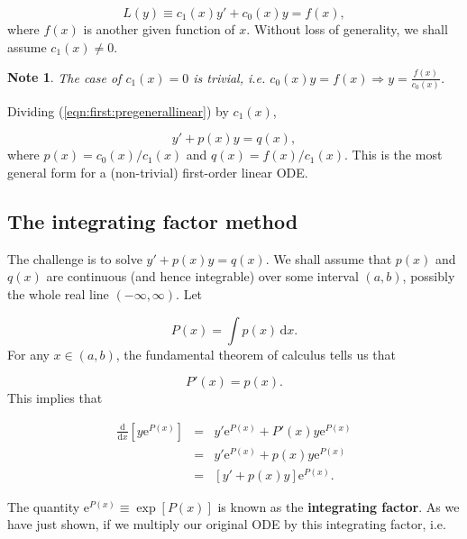 \documentclass[a4paper]{report}
\newtheorem*{note}{Note}
\begin{document}
\begin{equation}
\label{eqn:first:pregenerallinear}
L(y)\equiv c_1(x)y'+c_0(x)y = f(x),
\end{equation}
\noindent where $f(x)$ is another given function of $x$. Without loss of generality, we shall assume $c_1(x)\neq0$. 

\begin{note}
The case of $c_1(x)=0$ is trivial, i.e. $\displaystyle{c_0(x)y = f(x) \Longrightarrow y = \frac{f(x)}{c_0(x)}}$.
\end{note}

\noindent Dividing (\ref{eqn:first:pregenerallinear}) by $c_1(x)$, 

\begin{equation}
\label{eqn:first:generallinear}
y'+p(x)y = q(x),
\end{equation}
\noindent where $p(x)=c_0(x)/c_1(x)$ and $q(x)=f(x)/c_1(x)$. This is the most general form for a (non-trivial) first-order linear ODE.

\subsection{The integrating factor method}
\label{subsec:first:linearint} 
The challenge is to solve $y'+p(x)y = q(x)$. We shall assume that $p(x)$ and $q(x)$ are continuous (and hence integrable) over some interval $(a,b)$, possibly the whole real line $(-\infty,\infty)$. Let 

\begin{displaymath}
P(x) = \int p(x)\,\mathrm{d}x.
\end{displaymath}
\noindent For any $x\in(a,b)$, the fundamental theorem of calculus tells us that 

\begin{displaymath}
P'(x) = p(x).
\end{displaymath}
\noindent This implies that

\begin{eqnarray*}
\frac{\mathrm{d}}{\mathrm{d}x}\left[y\mathrm{e}^{P(x)}\right] &=& y'\mathrm{e}^{P(x)} + P'(x)y \mathrm{e}^{P(x)}\\
&=& y'\mathrm{e}^{P(x)} + p(x)y \mathrm{e}^{P(x)}\\
&=& \left[y'+p(x)y\right] \mathrm{e}^{P(x)}.
\end{eqnarray*}

\noindent The quantity $\displaystyle{\mathrm{e}^{P(x)}\equiv\exp\left[P(x)\right]}$ is known as the {\bf integrating factor}. As we have just shown, if we multiply our original ODE by this integrating factor, i.e.
\end{document}
